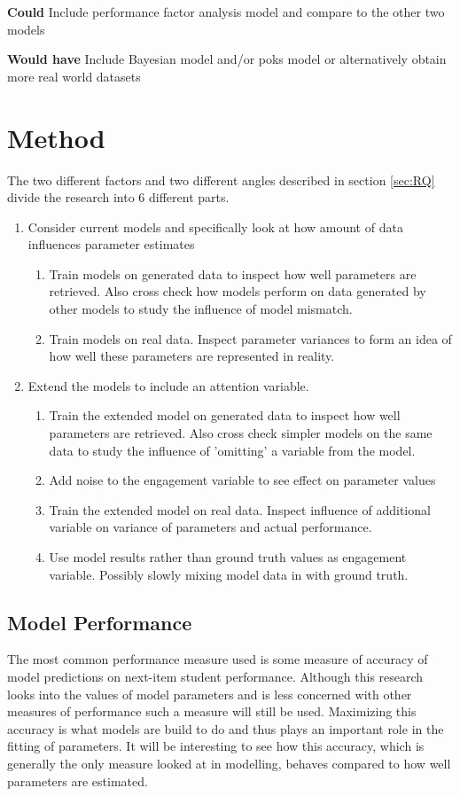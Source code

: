 \documentclass{article}
\begin{document}
{\bf Could} Include performance factor analysis model and compare to the other two models

{\bf Would have} Include Bayesian model and/or poks model or alternatively obtain more real world datasets

\section{Method}
The two different factors and two different angles described in section \ref{sec:RQ} divide the research into 6 different parts.
\begin{enumerate}
\item Consider current models and specifically look at how amount of data influences parameter estimates
\begin{enumerate}
\item Train models on generated data to inspect how well parameters are retrieved. Also cross check how models perform on data generated by other models to study the influence of model mismatch.
\item Train models on real data. Inspect parameter variances to form an idea of how well these parameters are represented in reality.
\end{enumerate}
\item Extend the models to include an attention variable.
\begin{enumerate}
\item Train the extended model on generated data to inspect how well parameters are retrieved. Also cross check simpler models on the same data to study the influence of 'omitting' a variable from the model.
\item Add noise to the engagement variable to see effect on parameter values
\item Train the extended model on real data. Inspect influence of additional variable on variance of parameters and actual performance.
\item Use model results rather than ground truth values as engagement variable. Possibly slowly mixing model data in with ground truth.
\end{enumerate}
\end{enumerate}


\subsection{Model Performance}
The most common performance measure used is some measure of accuracy of model predictions on next-item student performance. Although this research looks into the values of model parameters and is less concerned with other measures of performance such a measure will still be used. Maximizing this accuracy is what models are build to do and thus plays an important role in the fitting of parameters. It will be interesting to see how this accuracy, which is generally the only measure looked at in modelling, behaves compared to how well parameters are estimated.
\end{document}
